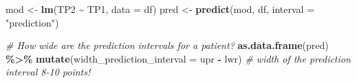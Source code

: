 \documentclass[
]{book}
\newenvironment{Shaded}{\begin{snugshade}}{\end{snugshade}}
\newcommand{\AttributeTok}[1]{\textcolor[rgb]{0.13,0.29,0.53}{#1}}
\newcommand{\CommentTok}[1]{\textcolor[rgb]{0.56,0.35,0.01}{\textit{#1}}}
\newcommand{\FunctionTok}[1]{\textcolor[rgb]{0.13,0.29,0.53}{\textbf{#1}}}
\newcommand{\NormalTok}[1]{#1}
\newcommand{\OtherTok}[1]{\textcolor[rgb]{0.56,0.35,0.01}{#1}}
\newcommand{\SpecialCharTok}[1]{\textcolor[rgb]{0.81,0.36,0.00}{\textbf{#1}}}
\newcommand{\StringTok}[1]{\textcolor[rgb]{0.31,0.60,0.02}{#1}}
\begin{document}
\begin{Shaded}
\begin{Highlighting}[]
\NormalTok{mod }\OtherTok{\textless{}{-}} \FunctionTok{lm}\NormalTok{(TP2 }\SpecialCharTok{\textasciitilde{}}\NormalTok{ TP1, }\AttributeTok{data =}\NormalTok{ df)}
\NormalTok{pred }\OtherTok{\textless{}{-}} \FunctionTok{predict}\NormalTok{(mod, df, }\AttributeTok{interval =} \StringTok{"prediction"}\NormalTok{)}

\CommentTok{\# How wide are the prediction intervals for a patient?}
\FunctionTok{as.data.frame}\NormalTok{(pred) }\SpecialCharTok{\%\textgreater{}\%} \FunctionTok{mutate}\NormalTok{(}\AttributeTok{width\_prediction\_interval =}\NormalTok{ upr }\SpecialCharTok{{-}}\NormalTok{ lwr) }\CommentTok{\# width of the prediction interval 8{-}10 points!}
\end{Highlighting}
\end{Shaded}
\end{document}
